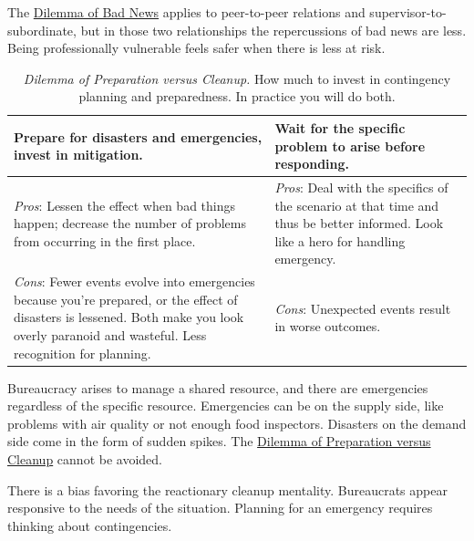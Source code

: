 The \href{table:bad-news-up-the-chain}{Dilemma of Bad News} applies to peer-to-peer relations and supervisor-to-subordinate, but in those two relationships the repercussions of bad news are less. Being professionally vulnerable feels safer when there is less at risk. 


\begin{center}
\begin{table}[H] %
\begin{tabular}{ | m{\dilemmatablewidth}| m{\dilemmatablewidth} | } 
  \hline
  \textbf{Prepare for disasters and emergencies, invest in mitigation.} &
  \textbf{Wait for the specific problem to arise before responding.} \\
  \hline
  \textit{Pros}: Lessen the effect when bad things happen; decrease the number of problems from occurring in the first place. &
  \textit{Pros}: Deal with the specifics of the scenario at that time and thus be better informed. Look like a hero for handling emergency. \\
  \hline
  \textit{Cons}: Fewer events evolve into emergencies because you're prepared, or the effect of disasters is lessened. Both make you look overly paranoid and wasteful. Less recognition for planning. & 
  \textit{Cons}: Unexpected events result in worse outcomes.  \\
  \hline
\end{tabular}
\caption{
\textit{Dilemma of Preparation versus Cleanup.} 
How much to invest in contingency planning and preparedness. In practice you will do both.}
\label{table:emergencies-vs-ignore}
\end{table}
\end{center}

Bureaucracy arises to manage a shared resource, and there are emergencies regardless of the specific resource. Emergencies can be on the supply side, like problems with air quality or not enough food inspectors. Disasters on the demand side come in the form of sudden spikes. The  \href{table:emergencies-vs-ignore}{Dilemma of Preparation versus Cleanup} cannot be avoided. 

There is a bias favoring the reactionary cleanup mentality. Bureaucrats appear responsive to the needs of the situation. Planning for an emergency requires thinking about contingencies. 

